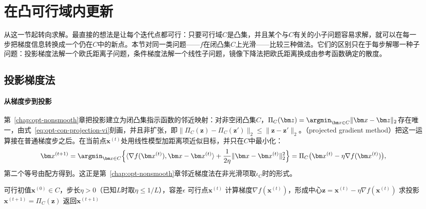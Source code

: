 \section{在凸可行域内更新}
\label{sec:opt-con-feasible-updates}

从这一节起转向求解。最直接的想法是让每个迭代点都可行：只要可行域$C$是凸集，并且某个与$C$有关的小子问题容易求解，就可以在每一步把梯度信息转换成一个仍在$C$中的新点。本节对同一类问题——$f$在闭凸集$C$上光滑——比较三种做法。它们的区别只在于每步解哪一种子问题：投影梯度法解一个欧氏距离子问题，条件梯度法解一个线性子问题，镜像下降法把欧氏距离换成由参考函数确定的散度。

\subsection{投影梯度法}
\label{sec:opt-con-projected-gradient}

\paragraph{从梯度步到投影}
第~\ref{chap:opt-nonsmooth}章把投影建立为闭凸集指示函数的邻近映射：对非空闭凸集$C$，$\Pi_C(\bm z)=\argmin_{\bm x\in C}\lVert\bm x-\bm z\rVert_2$存在唯一，由式~\eqref{eq:opt-con-projection-vi}刻画，并且非扩张，即$\lVert\Pi_C(\bm z)-\Pi_C(\bm z')\rVert_2\leq\lVert\bm z-\bm z'\rVert_2$。（projected gradient method）把这一运算接在普通梯度步之后。在当前点$\bm x^{(t)}$处用线性模型加距离项近似目标，并只在$C$中最小化：
\[
  \bm x^{(t+1)}=\argmin_{\bm x\in C}\Bigl\{\langle\nabla f(\bm x^{(t)}),\bm x-\bm x^{(t)}\rangle+\frac1{2\eta}\lVert\bm x-\bm x^{(t)}\rVert_2^2\Bigr\}
  =\Pi_C\bigl(\bm x^{(t)}-\eta\nabla f(\bm x^{(t)})\bigr),
\]
第二个等号由配方得到。这正是第~\ref{chap:opt-nonsmooth}章邻近梯度法在非光滑项取$\iota_C$时的形式。

\begin{algorithm}[投影梯度法]
\label{alg:opt-con-projected-gradient}
\begin{algorithmic}[1]
\Require 可行初值$\bm x^{(0)}\in C$，步长$\eta>0$（已知$L$时取$\eta\leq1/L$），容差$\epsilon$
\Ensure 可行点$\bm x^{(t)}$
  \State 计算梯度$\nabla f(\bm x^{(t)})$，形成中心$\bm z=\bm x^{(t)}-\eta\nabla f(\bm x^{(t)})$
  \State 求投影$\bm x^{(t+1)}=\Pi_C(\bm z)$
    \State 返回$\bm x^{(t+1)}$
  \EndIf
\EndFor
\end{algorithmic}
\end{algorithm}

